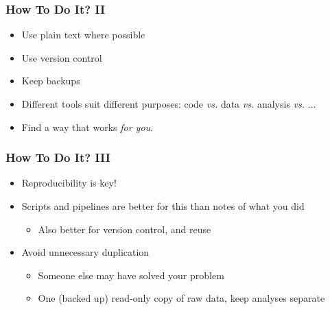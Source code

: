 \begin{frame}
  \frametitle{How To Do It? II}
  \begin{itemize}
    \item Use plain text where possible
      \item Use version control
      \item Keep backups
      \item Different tools suit different purposes: code \textit{vs.} data \textit{vs.} analysis \textit{vs.} $\ldots$
      \item Find a way that works \emph{for you}.
  \end{itemize}
\end{frame}

\begin{frame}
  \frametitle{How To Do It? III}
  \begin{itemize}
    \item Reproducibility is key!
    \item Scripts and pipelines are better for this than notes of what you did
    \begin{itemize}
      \item Also better for version control, and reuse
    \end{itemize}
    \item Avoid unnecessary duplication
    \begin{itemize}
      \item Someone else may have solved your problem
      \item One (backed up) read-only copy of raw data, keep analyses separate
    \end{itemize}
  \end{itemize}
\end{frame}
